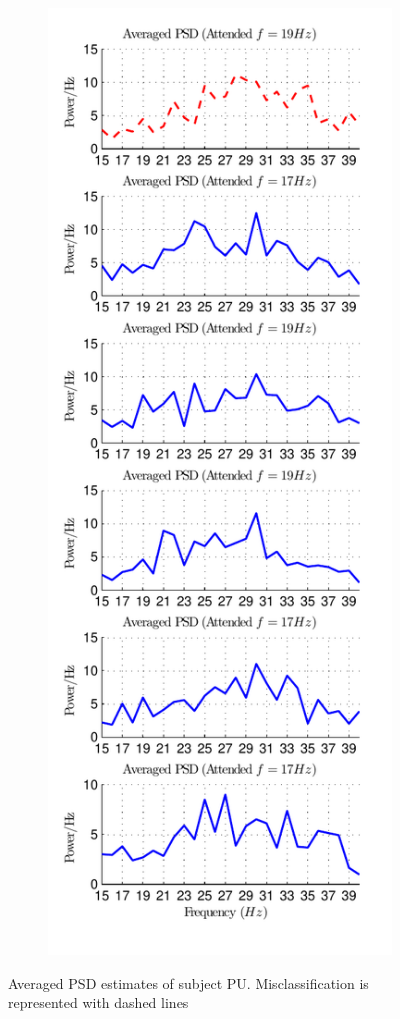 \documentclass[12pt]{article}
\numberwithin{equation}{section}
\numberwithin{figure}{section}
\numberwithin{table}{section}
\begin{document}
\begin{figure}
\begin{subfigure}{.5\textwidth}
        \label{fig:results_pu_1}
    \end{subfigure}%
    \begin{subfigure}{.5\textwidth}
        \centering
        \includegraphics[scale=0.85]{images/results-psd-PU_23-01-2014-18-59}
        \label{fig:results_pu_2}
    \end{subfigure}
    \vspace*{-1cm}\caption[Averaged PSD Estimates of Subject PU]{Averaged PSD estimates of subject PU. Misclassification is represented with dashed lines}
    \label{fig:results_PU}
\end{figure}
\end{document}
